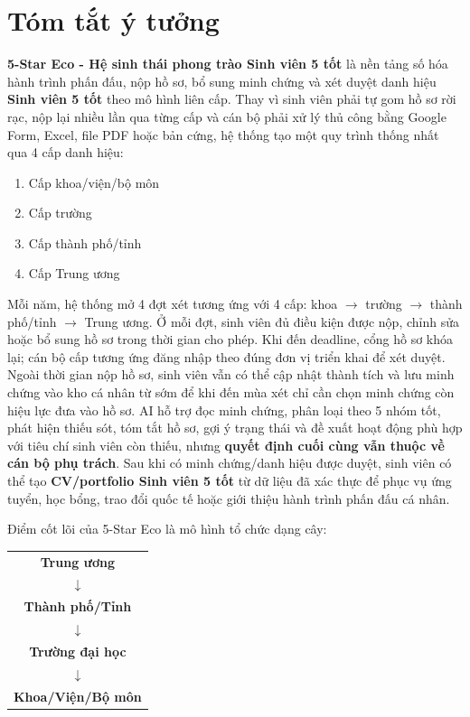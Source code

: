 \section{Tóm tắt ý tưởng}

\textbf{5-Star Eco - Hệ sinh thái phong trào Sinh viên 5 tốt} là nền tảng số hóa hành trình phấn đấu, nộp hồ sơ, bổ sung minh chứng và xét duyệt danh hiệu \textbf{Sinh viên 5 tốt} theo mô hình liên cấp. Thay vì sinh viên phải tự gom hồ sơ rời rạc, nộp lại nhiều lần qua từng cấp và cán bộ phải xử lý thủ công bằng Google Form, Excel, file PDF hoặc bản cứng, hệ thống tạo một quy trình thống nhất qua 4 cấp danh hiệu:
\begin{enumerate}
    \item Cấp khoa/viện/bộ môn
    \item Cấp trường
    \item Cấp thành phố/tỉnh
    \item Cấp Trung ương
\end{enumerate}
Mỗi năm, hệ thống mở 4 đợt xét tương ứng với 4 cấp: khoa $\rightarrow$ trường $\rightarrow$ thành phố/tỉnh $\rightarrow$ Trung ương. Ở mỗi đợt, sinh viên đủ điều kiện được nộp, chỉnh sửa hoặc bổ sung hồ sơ trong thời gian cho phép. Khi đến deadline, cổng hồ sơ khóa lại; cán bộ cấp tương ứng đăng nhập theo đúng đơn vị triển khai để xét duyệt. Ngoài thời gian nộp hồ sơ, sinh viên vẫn có thể cập nhật thành tích và lưu minh chứng vào kho cá nhân từ sớm để khi đến mùa xét chỉ cần chọn minh chứng còn hiệu lực đưa vào hồ sơ. AI hỗ trợ đọc minh chứng, phân loại theo 5 nhóm tốt, phát hiện thiếu sót, tóm tắt hồ sơ, gợi ý trạng thái và đề xuất hoạt động phù hợp với tiêu chí sinh viên còn thiếu, nhưng \textbf{quyết định cuối cùng vẫn thuộc về cán bộ phụ trách}. Sau khi có minh chứng/danh hiệu được duyệt, sinh viên có thể tạo \textbf{CV/portfolio Sinh viên 5 tốt} từ dữ liệu đã xác thực để phục vụ ứng tuyển, học bổng, trao đổi quốc tế hoặc giới thiệu hành trình phấn đấu cá nhân.

\noindent Điểm cốt lõi của 5-Star Eco là mô hình tổ chức dạng cây:

\begin{center}
\begin{tabular}{c}
\textbf{Trung ương} \\
$\downarrow$ \\
\textbf{Thành phố/Tỉnh} \\
$\downarrow$ \\
\textbf{Trường đại học} \\
$\downarrow$ \\
\textbf{Khoa/Viện/Bộ môn}
\end{tabular}
\end{center}

